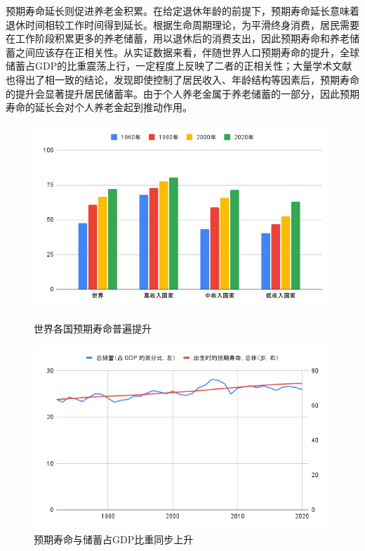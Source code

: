 \documentclass[a4paper,zihao=5]{ctexart}
\begin{document}
预期寿命延长则促进养老金积累。在给定退休年龄的前提下，预期寿命延长意味着退休时间相较工作时间得到延长。根据生命周期理论，为平滑终身消费，居民需要在工作阶段积累更多的养老储蓄，用以退休后的消费支出，因此预期寿命和养老储蓄之间应该存在正相关性。从实证数据来看，伴随世界人口预期寿命的提升，全球储蓄占GDP的比重震荡上行，一定程度上反映了二者的正相关性；大量学术文献也得出了相一致的结论\cite{bloom2003longevity,de2009life}，发现即使控制了居民收入、年龄结构等因素后，预期寿命的提升会显著提升居民储蓄率。由于个人养老金属于养老储蓄的一部分，因此预期寿命的延长会对个人养老金起到推动作用。
\begin{figure}[H]
    \centering
    \begin{minipage}{0.48\linewidth}
        \includegraphics[width=\linewidth]{img/世界各国预期寿命普遍提升.png}
        \caption{世界各国预期寿命普遍提升}
    \end{minipage}
    \begin{minipage}{0.48\linewidth}
        \includegraphics[width=\linewidth]{img/人口预期寿命与储蓄占GDP比重同步上升.png}
        \caption{预期寿命与储蓄占GDP比重同步上升}
    \end{minipage}
\end{figure}
\end{document}
